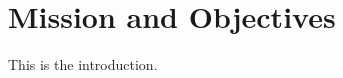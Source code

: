 \section{Mission and Objectives}
\label{sec:Introduction}
\newcommand{\indentitem}{\setlength\itemindent{25pt}}%

This is the introduction.

